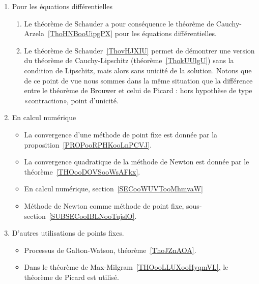 \begin{enumerate}
	\item Pour les équations différentielles
	      \begin{enumerate}
		      \item
		            Le théorème de Schauder a pour conséquence le théorème de Cauchy-Arzela~\ref{ThoHNBooUipgPX} pour les équations différentielles.
		      \item
		            Le théorème de Schauder~\ref{ThovHJXIU} permet de démontrer une version du théorème de Cauchy-Lipschitz (théorème~\ref{ThokUUlgU}) sans la condition de Lipschitz, mais alors sans unicité de la solution. Notons que de ce point de vue nous sommes dans la même situation que la différence entre le théorème de Brouwer et celui de Picard : hors hypothèse de type «contraction», point d'unicité.
	      \end{enumerate}
	\item
	      En calcul numérique
	      \begin{itemize}
		      \item
		            La convergence d'une méthode de point fixe est donnée par la proposition~\ref{PROPooRPHKooLnPCVJ}.
		      \item
		            La convergence quadratique de la méthode de Newton est donnée par le théorème~\ref{THOooDOVSooWsAFkx}.
		      \item
		            En calcul numérique, section~\ref{SECooWUVTooMhmvaW}
		      \item
		            Méthode de Newton comme méthode de point fixe, sous-section~\ref{SUBSECooIBLNooTujslO}.
	      \end{itemize}

	\item
	      D'autres utilisations de points fixes.
	      \begin{itemize}
		      \item
		            Processus de Galton-Watson, théorème~\ref{ThoJZnAOA}.
		      \item
		            Dans le théorème de Max-Milgram~\ref{THOooLLUXooHyqmVL}, le théorème de Picard est utilisé.
	      \end{itemize}
\end{enumerate}
